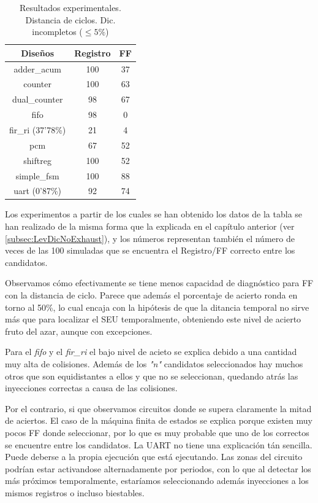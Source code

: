 \begin{table}[htbp]
    \ttabbox
    {\caption{Resultados experimentales. Distancia de ciclos. Dic.
    incompletos ($\leq5\%$)}
    \label{tab:LevenRes}}
    {
        \begin{tabular}{c|c c}
            \hline
            \rule[-8pt]{0pt}{22pt}{\bfseries{Diseños}}&{\bfseries{Registro}}
            &{\bfseries{\gls{FF}}} \\
            \hline
            \rule{0pt}{14pt}adder\_acum & 100 & 37\\
            counter & 100 & 63\\
            dual\_counter & 98 & 67\\
            fifo & 98 & 0\\
            fir\_ri (37'78\%) & 21 & 4\\
            pcm & 67 & 52\\
            shiftreg & 100 & 52\\
            simple\_fsm & 100 & 88\\
            uart (0'87\%) & 92 & 74\\
            \hline
        \end{tabular}
    }
\end{table}

Los experimentos a partir de los cuales se han obtenido los datos de la tabla se
han realizado de la misma forma que la explicada en el capítulo anterior
(ver \ref{subsec:LevDicNoExhaust}), y los números representan también el número de
veces de las 100 simuladas que se encuentra el Registro/FF correcto entre los
candidatos.

Observamos cómo efectivamente se tiene menos capacidad de diagnóstico para 
\gls{FF} con la distancia de ciclo. Parece que además el porcentaje de acierto
ronda en torno al 50\%, lo cual encaja con la hipótesis de que la ditancia
temporal no sirve más que para localizar el \gls{SEU} temporalmente, obteniendo
este nivel de acierto fruto del azar, aunque con excepciones.

Para el \textit{fifo} y el \textit{fir\_ri} el bajo nivel de acieto se explica
debido a una cantidad muy alta de colisiones. Además de los \textit{"n"} 
candidatos seleccionados hay muchos otros que son equidistantes a ellos y que no
se seleccionan, quedando atrás las inyecciones correctas a causa de las
colisiones.

Por el contrario, si que observamos circuitos donde se supera claramente la mitad
de aciertos. El caso de la máquina finita de estados se explica porque existen muy
pocos \gls{FF} donde seleccionar, por lo que es muy probable que uno de los
correctos se encuentre entre los candidatos. La \gls{UART} no tiene una
explicación tán sencilla. Puede deberse a la propia ejecución que está ejecutando.
Las zonas del circuito podrían estar activandose alternadamente por periodos, con
lo que al detectar los más próximos temporalmente, estaríamos seleccionando además
inyecciones a los mismos registros o incluso biestables.

\endinput
